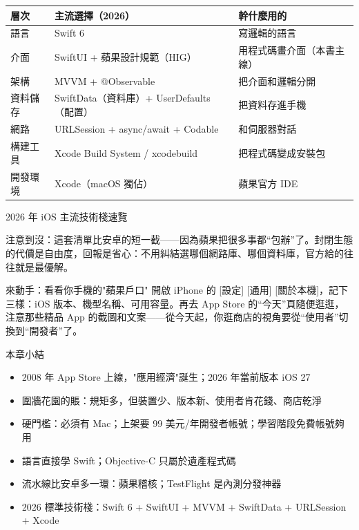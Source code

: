 
\begin{center}
\begin{tabularx}{\linewidth}{|X|X|X|}
\hline
\textbf{層次} & \textbf{主流選擇（2026）} & \textbf{幹什麼用的} \tabularnewline
\hline
語言 & Swift 6 & 寫邏輯的語言 \tabularnewline
介面 & SwiftUI + 蘋果設計規範（HIG） & 用程式碼畫介面（本書主線） \tabularnewline
架構 & MVVM + @Observable & 把介面和邏輯分開 \tabularnewline
資料儲存 & SwiftData（資料庫）+ UserDefaults（配置） & 把資料存進手機 \tabularnewline
網路 & URLSession + async/await + Codable & 和伺服器對話 \tabularnewline
構建工具 & Xcode Build System / xcodebuild & 把程式碼變成安裝包 \tabularnewline
開發環境 & Xcode（macOS 獨佔） & 蘋果官方 IDE \tabularnewline
\hline
\end{tabularx}
\end{center}

\begin{center}\small\color{gray}2026 年 iOS 主流技術棧速覽\end{center}

注意到沒：這套清單比安卓的短一截——因為蘋果把很多事都“包辦”了。封閉生態的代價是自由度，回報是省心：不用糾結選哪個網路庫、哪個資料庫，官方給的往往就是最優解。

\begin{tcbpractice}{來動手：看看你手機的"蘋果戶口"}
開啟 iPhone 的 [設定] [通用] [關於本機]，記下三樣：iOS 版本、機型名稱、可用容量。再去 App Store 的“今天”頁隨便逛逛，注意那些精品 App 的截圖和文案——從今天起，你逛商店的視角要從“使用者”切換到“開發者”了。

\end{tcbpractice}

\begin{tcbsummary}{本章小結}
\begin{itemize}
  \item 2008 年 App Store 上線，"應用經濟"誕生；2026 年當前版本 iOS 27
  \item 圍牆花園的賬：規矩多，但裝置少、版本新、使用者肯花錢、商店乾淨
  \item 硬門檻：必須有 Mac；上架要 99 美元/年開發者帳號；學習階段免費帳號夠用
  \item 語言直接學 Swift；Objective-C 只屬於遺產程式碼
  \item 流水線比安卓多一環：蘋果稽核；TestFlight 是內測分發神器
  \item 2026 標準技術棧：Swift 6 + SwiftUI + MVVM + SwiftData + URLSession + Xcode
\end{itemize}

\end{tcbsummary}
